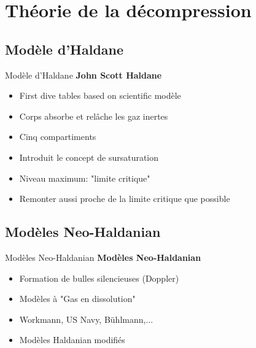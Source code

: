
\section{Théorie de la décompression}
\subsection{Modèle d'Haldane}

\begin{frame}{Modèle d'Haldane}
	\textbf{John Scott Haldane}
	\begin{itemize}
		\item First dive tables based on scientific modèle
		\item Corps absorbe et relâche les gaz inertes
		\item Cinq compartiments
		\item Introduit le concept de sursaturation
		\item Niveau maximum: "limite critique"
		\item Remonter aussi proche de la limite critique que possible
	\end{itemize}
\end{frame}

\subsection{Modèles Neo-Haldanian}

\begin{frame}{Modèles Neo-Haldanian}  
	\textbf{Modèles Neo-Haldanian}
	\begin{itemize}
		\item Formation de bulles silencieuses (Doppler)
		\item Modèles à "Gas en dissolution"
		\item Workmann, US Navy, Bühlmann,...
		\item Modèles Haldanian modifiés
	\end{itemize}
\end{frame}

